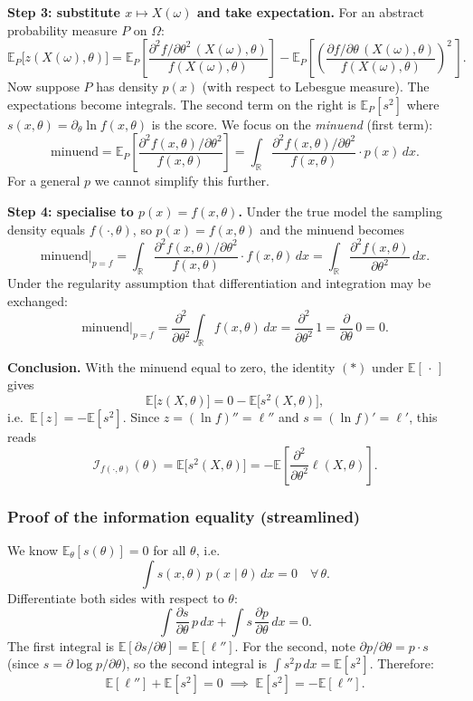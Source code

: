 \documentclass[a4paper,oneside,12pt]{extarticle}
\theoremstyle{plain}
\theoremstyle{definition}
\theoremstyle{remark}
\newcommand*{\E}{\mathbb{E}}
\begin{document}
\medskip
\noindent\textbf{Step 3: substitute $x\mapsto X(\omega)$ and take
expectation.}
For an abstract probability measure $P$ on $\Omega$:
\[
  \E_P\bigl[z(X(\omega),\theta)\bigr]
  = \E_P\!\left[\frac{\partial^2 f/\partial\theta^2\,(X(\omega),\theta)}
                     {f(X(\omega),\theta)}\right]
  - \E_P\!\left[\left(\frac{\partial f/\partial\theta\,(X(\omega),\theta)}
                           {f(X(\omega),\theta)}\right)^{\!2}\,\right].
\]
Now suppose $P$ has density $p(x)$ (with respect to Lebesgue
measure). The expectations become integrals.  The second term on the
right is $\E_P[s^2]$ where $s(x,\theta)=\partial_\theta\ln f(x,\theta)$
is the score.  We focus on the \emph{minuend} (first term):
\[
  \text{minuend}
  = \E_P\!\left[\frac{\partial^2 f(x,\theta)/\partial\theta^2}
                     {f(x,\theta)}\right]
  = \int_{\mathbb{R}}
      \frac{\partial^2 f(x,\theta)/\partial\theta^2}{f(x,\theta)}
      \cdot p(x)\,dx.
\]
For a general $p$ we cannot simplify this further.

\medskip
\noindent\textbf{Step 4: specialise to $p(x)=f(x,\theta)$.}
Under the true model the sampling density equals $f(\cdot,\theta)$,
so $p(x)=f(x,\theta)$ and the minuend becomes
\[
  \text{minuend}\big|_{p=f}
  = \int_{\mathbb{R}}
      \frac{\partial^2 f(x,\theta)/\partial\theta^2}{f(x,\theta)}
      \cdot f(x,\theta)\,dx
  = \int_{\mathbb{R}} \frac{\partial^2 f(x,\theta)}{\partial\theta^2}\,dx.
\]
Under the regularity assumption that differentiation and integration
may be exchanged:
\[
  \text{minuend}\big|_{p=f}
  = \frac{\partial^2}{\partial\theta^2}\int_{\mathbb{R}} f(x,\theta)\,dx
  = \frac{\partial^2}{\partial\theta^2}\,1
  = \frac{\partial}{\partial\theta}\,0 = 0.
\]

\medskip
\noindent\textbf{Conclusion.}
With the minuend equal to zero, the identity $(*)$ under $\E[\,\cdot\,]$
gives
\[
  \E\bigl[z(X,\theta)\bigr]
  = 0 - \E\bigl[s^2(X,\theta)\bigr],
\]
i.e.\ $\E[z] = -\E[s^2]$.  Since $z=(\ln f)''=\ell''$ and
$s=(\ln f)'=\ell'$, this reads
\[
  \boxed{
    \mathcal{I}_{f(\cdot,\theta)}(\theta)
    = \E\bigl[s^2(X,\theta)\bigr]
    = -\E\!\left[\frac{\partial^2}{\partial\theta^2}\ell(X,\theta)\right].
  }
\]

\subsubsection{Proof of the information equality (streamlined)}

We know $\E_\theta[s(\theta)] = 0$ for all $\theta$, i.e.\
\[
  \int s(x,\theta)\,p(x\mid\theta)\,dx = 0 \quad \forall\,\theta.
\]
Differentiate both sides with respect to $\theta$:
\[
  \int \frac{\partial s}{\partial\theta}\,p\,dx
  + \int s\,\frac{\partial p}{\partial\theta}\,dx = 0.
\]
The first integral is $\E[\partial s/\partial\theta] = \E[\ell'']$.
For the second, note $\partial p/\partial\theta = p \cdot s$
(since $s = \partial\log p/\partial\theta$), so the second integral is
$\int s^2 p\,dx = \E[s^2]$.  Therefore:
\[
  \E[\ell''] + \E[s^2] = 0
  \;\implies\;
  \boxed{\E[s^2] = -\E[\ell''].}
\]
\end{document}
